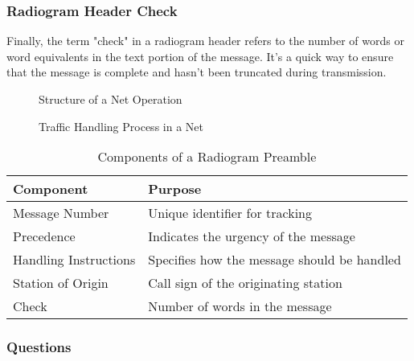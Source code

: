 \subsubsection*{Radiogram Header Check}
Finally, the term "check" in a radiogram header refers to the number of words or word equivalents in the text portion of the message. It's a quick way to ensure that the message is complete and hasn't been truncated during transmission.

\begin{figure}[h]
    \centering
    \caption{Structure of a Net Operation}
    \label{fig:net-structure}
\end{figure}

\begin{figure}[h]
    \centering
    \caption{Traffic Handling Process in a Net}
    \label{fig:traffic-handling}
\end{figure}

\begin{table}[h]
    \centering
    \begin{tabular}{|l|l|}
        \hline
        \textbf{Component} & \textbf{Purpose} \\
        \hline
        Message Number & Unique identifier for tracking \\
        Precedence & Indicates the urgency of the message \\
        Handling Instructions & Specifies how the message should be handled \\
        Station of Origin & Call sign of the originating station \\
        Check & Number of words in the message \\
        \hline
    \end{tabular}
    \caption{Components of a Radiogram Preamble}
    \label{tab:radiogram-preamble}
\end{table}

\subsubsection{Questions}


